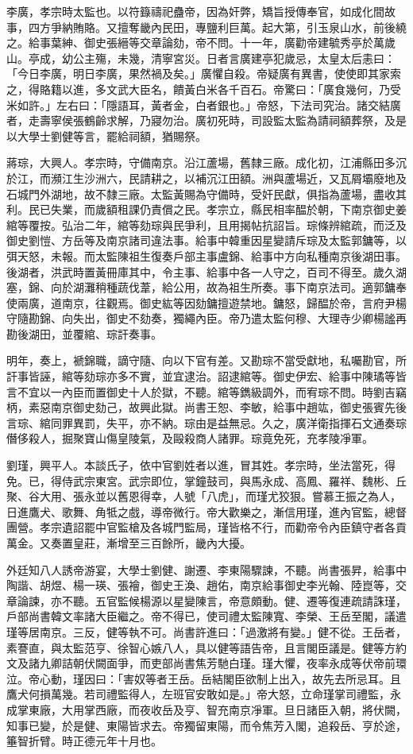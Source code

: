 \begin{pinyinscope}
李廣，孝宗時太監也。以符籙禱祀蠱帝，因為奸弊，矯旨授傳奉官，如成化間故事，四方爭納賄賂。又擅奪畿內民田，專鹽利巨萬。起大第，引玉泉山水，前後繞之。給事葉紳、御史張縉等交章論劾，帝不問。十一年，廣勸帝建毓秀亭於萬歲山。亭成，幼公主殤，未幾，清寧宮災。日者言廣建亭犯歲忌，太皇太后恚曰：「今日李廣，明日李廣，果然禍及矣。」廣懼自殺。帝疑廣有異書，使使即其家索之，得賂籍以進，多文武大臣名，饋黃白米各千百石。帝驚曰：「廣食幾何，乃受米如許。」左右曰：「隱語耳，黃者金，白者銀也。」帝怒，下法司究治。諸交結廣者，走壽寧侯張鶴齡求解，乃寢勿治。廣初死時，司設監太監為請祠額葬祭，及是以大學士劉健等言，罷給祠額，猶賜祭。

蔣琮，大興人。孝宗時，守備南京。沿江蘆場，舊隸三廠。成化初，江浦縣田多沉於江，而瀕江生沙洲六，民請耕之，以補沉江田額。洲與蘆場近，又瓦屑壩廢地及石城門外湖地，故不隸三廠。太監黃賜為守備時，受奸民獻，俱指為蘆場，盡收其利。民已失業，而歲額租課仍責償之民。孝宗立，縣民相率醖於朝，下南京御史姜綰等覆按。弘治二年，綰等劾琮與民爭利，且用揭帖抗詔旨。琮條辨綰疏，而泛及御史劉愷、方岳等及南京諸司違法事。給事中韓重因星變請斥琮及太監郭鏞等，以弭天怒，未報。而太監陳祖生復奏戶部主事盧錦、給事中方向私種南京後湖田事。後湖者，洪武時置黃冊庫其中，令主事、給事中各一人守之，百司不得至。歲久湖塞，錦、向於湖灘稍種蔬伐葦，給公用，故為祖生所奏。事下南京法司。適郭鏞奉使兩廣，道南京，往觀焉。御史紘等因劾鏞擅遊禁地。鏞怒，歸醖於帝，言府尹楊守隨勘錦、向失出，御史不劾奏，獨繩內臣。帝乃遣太監何穆、大理寺少卿楊謐再勘後湖田，並覆綰、琮訐奏事。

明年，奏上，褫錦職，謫守隨、向以下官有差。又勘琮不當受獻地，私囑勘官，所訐事皆誣，綰等劾琮亦多不實，並宜逮治。詔逮綰等。御史伊宏、給事中陳璚等皆言不宜以一內臣而置御史十人於獄，不聽。綰等鐫級調外，而宥琮不問。時劉吉竊柄，素惡南京御史劾己，故興此獄。尚書王恕、李敏，給事中趙竑，御史張賓先後言琮、綰同罪異罰，失平，亦不納。琮由是益無忌。久之，廣洋衛指揮石文通奏琮僭侈殺人，掘聚寶山傷皇陵氣，及毆殺商人諸罪。琮竟免死，充孝陵凈軍。

劉瑾，興平人。本談氏子，依中官劉姓者以進，冒其姓。孝宗時，坐法當死，得免。已，得侍武宗東宮。武宗即位，掌鐘鼓司，與馬永成、高鳳、羅祥、魏彬、丘聚、谷大用、張永並以舊恩得幸，人號「八虎」，而瑾尤狡狠。嘗慕王振之為人，日進鷹犬、歌舞、角牴之戲，導帝微行。帝大歡樂之，漸信用瑾，進內官監，總督團營。孝宗遺詔罷中官監槍及各城門監局，瑾皆格不行，而勸帝令內臣鎮守者各貢萬金。又奏置皇莊，漸增至三百餘所，畿內大擾。

外廷知八人誘帝游宴，大學士劉健、謝遷、李東陽驟諫，不聽。尚書張昇，給事中陶諧、胡煜、楊一瑛、張襘，御史王渙、趙佑，南京給事御史李光翰、陸崑等，交章論諫，亦不聽。五官監候楊源以星變陳言，帝意頗動。健、遷等復連疏請誅瑾，戶部尚書韓文率諸大臣繼之。帝不得已，使司禮太監陳寬、李榮、王岳至閣，議遣瑾等居南京。三反，健等執不可。尚書許進曰：「過激將有變。」健不從。王岳者，素謇直，與太監范亨、徐智心嫉八人，具以健等語告帝，且言閣臣議是。健等方約文及諸九卿詰朝伏闕面爭，而吏部尚書焦芳馳白瑾。瑾大懼，夜率永成等伏帝前環泣。帝心動，瑾因曰：「害奴等者王岳。岳結閣臣欲制上出入，故先去所忌耳。且鷹犬何損萬幾。若司禮監得人，左班官安敢如是。」帝大怒，立命瑾掌司禮監，永成掌東廠，大用掌西廠，而夜收岳及亨、智充南京凈軍。旦日諸臣入朝，將伏闕，知事已變，於是健、東陽皆求去。帝獨留東陽，而令焦芳入閣，追殺岳、亨於途，箠智折臂。時正德元年十月也。


\end{pinyinscope}
